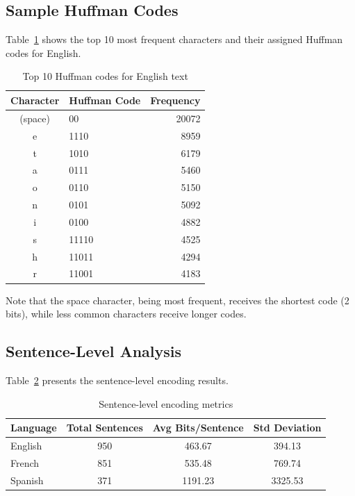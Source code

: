 \documentclass[11pt,a4paper]{article}
\begin{document}
\subsection{Sample Huffman Codes}

Table~\ref{tab:huffman} shows the top 10 most frequent characters and their assigned Huffman codes for English.

\begin{table}[H]
\centering
\begin{tabular}{|c|l|r|}
\hline
\textbf{Character} & \textbf{Huffman Code} & \textbf{Frequency} \\
\hline
(space) & 00 & 20072 \\
e & 1110 & 8959 \\
t & 1010 & 6179 \\
a & 0111 & 5460 \\
o & 0110 & 5150 \\
n & 0101 & 5092 \\
i & 0100 & 4882 \\
s & 11110 & 4525 \\
h & 11011 & 4294 \\
r & 11001 & 4183 \\
\hline
\end{tabular}
\caption{Top 10 Huffman codes for English text}
\label{tab:huffman}
\end{table}

Note that the space character, being most frequent, receives the shortest code (2 bits), while less common characters receive longer codes.

\subsection{Sentence-Level Analysis}

Table~\ref{tab:sentences} presents the sentence-level encoding results.

\begin{table}[H]
\centering
\begin{tabular}{|l|c|c|c|}
\hline
\textbf{Language} & \textbf{Total Sentences} & \textbf{Avg Bits/Sentence} & \textbf{Std Deviation} \\
\hline
English & 950 & 463.67 & 394.13 \\
French & 851 & 535.48 & 769.74 \\
Spanish & 371 & 1191.23 & 3325.53 \\
\hline
\end{tabular}
\caption{Sentence-level encoding metrics}
\label{tab:sentences}
\end{table}
\end{document}
